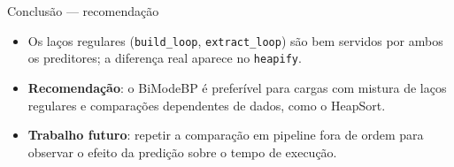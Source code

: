 \documentclass[aspectratio=169,11pt]{beamer}
\begin{document}
\begin{frame}{Conclusão --- recomendação}
  \begin{itemize}
    \item Os laços regulares (\texttt{build\_loop}, \texttt{extract\_loop}) são bem
          servidos por ambos os preditores; a diferença real aparece no \texttt{heapify}.
    \item \textbf{Recomendação}: o BiModeBP é preferível para cargas com mistura de
          laços regulares e comparações dependentes de dados, como o HeapSort.
    \item \textbf{Trabalho futuro}: repetir a comparação em pipeline fora de
          ordem para observar o efeito da predição sobre o tempo de execução.
  \end{itemize}
\end{frame}
\end{document}
